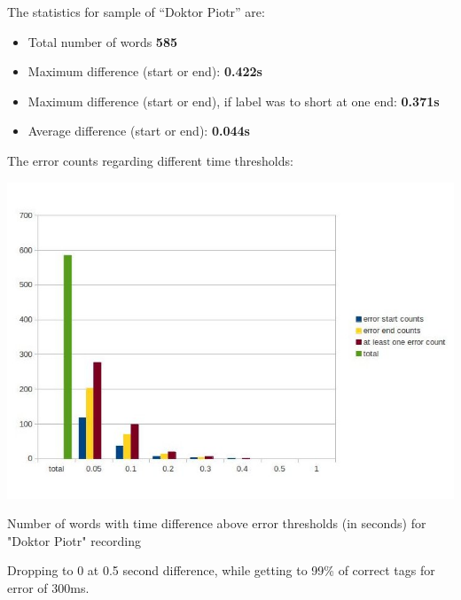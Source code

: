 \documentclass[12pt,a4paper,english]{article}
\begin{document}
The statistics for sample of “Doktor Piotr” are: \newline
\begin{itemize}
    \item Total number of words				\textbf{585}
    \item Maximum difference (start or end): 			\textbf{0.422s}
    \item Maximum difference (start or end), if label was to short at one end: 			\textbf{0.371s}
    \item Average difference  (start or end):			\textbf{0.044s}
\end{itemize}
The error counts regarding different time thresholds:
\begin{center}
    \includegraphics[scale=0.6]{doktor_piotr_length_based_counts.jpg}
    \caption[]{Number of words with time difference above error thresholds (in seconds) for "Doktor Piotr" recording}
\end{center}
Dropping to 0 at 0.5 second difference, while getting to 99\% of correct tags for error of 300ms.
\end{document}
